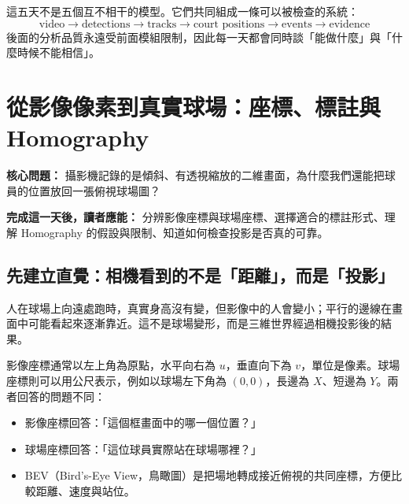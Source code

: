 \documentclass[11pt,a4paper,oneside]{report}
\begin{document}
\begin{takeawayBox}
這五天不是五個互不相干的模型。它們共同組成一條可以被檢查的系統：
\[
\text{video}\rightarrow\text{detections}\rightarrow\text{tracks}\rightarrow\text{court positions}\rightarrow\text{events}\rightarrow\text{evidence}
\]
後面的分析品質永遠受前面模組限制，因此每一天都會同時談「能做什麼」與「什麼時候不能相信」。
\end{takeawayBox}

\clearpage
{}

\chapter{從影像像素到真實球場：座標、標註與 Homography}

\begin{heroBox}
\textbf{核心問題：}\quad
攝影機記錄的是傾斜、有透視縮放的二維畫面，為什麼我們還能把球員的位置放回一張俯視球場圖？

\textbf{完成這一天後，讀者應能：}\quad
分辨影像座標與球場座標、選擇適合的標註形式、理解 Homography 的假設與限制、知道如何檢查投影是否真的可靠。
\end{heroBox}

\section{先建立直覺：相機看到的不是「距離」，而是「投影」}

\begin{conceptBox}
人在球場上向遠處跑時，真實身高沒有變，但影像中的人會變小；平行的邊線在畫面中可能看起來逐漸靠近。這不是球場變形，而是三維世界經過相機投影後的結果。
\end{conceptBox}

影像座標通常以左上角為原點，水平向右為 $u$，垂直向下為 $v$，單位是像素。球場座標則可以用公尺表示，例如以球場左下角為 $(0,0)$，長邊為 $X$、短邊為 $Y$。兩者回答的問題不同：

\begin{itemize}
  \item 影像座標回答：「這個框畫面中的哪一個位置？」
  \item 球場座標回答：「這位球員實際站在球場哪裡？」
  \item BEV（Bird's-Eye View，鳥瞰圖）是把場地轉成接近俯視的共同座標，方便比較距離、速度與站位。
\end{itemize}
\end{document}
